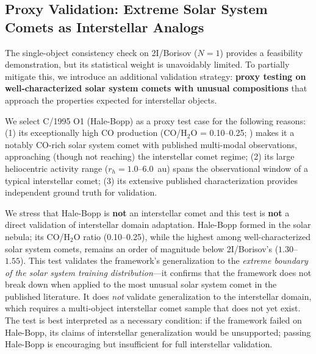 \documentclass[usenatbib]{mnras}
\begin{document}
\subsection{Proxy Validation: Extreme Solar System Comets as Interstellar Analogs}\label{sec:proxy}

The single-object consistency check on 2I/Borisov ($N=1$) provides a feasibility demonstration, but its statistical weight is unavoidably limited. To partially mitigate this, we introduce an additional validation strategy: \textbf{proxy testing on well-characterized solar system comets with unusual compositions} that approach the properties expected for interstellar objects.

We select C/1995 O1 (Hale-Bopp) as a proxy test case for the following reasons: (1) its exceptionally high CO production (CO/H$_2$O = 0.10--0.25; \citealt{bockelee04}) makes it a notably CO-rich solar system comet with published multi-modal observations, approaching (though not reaching) the interstellar comet regime; (2) its large heliocentric activity range ($r_h = 1.0$--6.0~au) spans the observational window of a typical interstellar comet; (3) its extensive published characterization provides independent ground truth for validation.

We stress that Hale-Bopp is \textbf{not} an interstellar comet and this test is \textbf{not} a direct validation of interstellar domain adaptation. Hale-Bopp formed in the solar nebula; its CO/H$_2$O ratio (0.10--0.25), while the highest among well-characterized solar system comets, remains an order of magnitude below 2I/Borisov's ($1.30$--$1.55$). This test validates the framework's generalization to the \textit{extreme boundary of the solar system training distribution}---it confirms that the framework does not break down when applied to the most unusual solar system comet in the published literature. It does \textit{not} validate generalization to the interstellar domain, which requires a multi-object interstellar comet sample that does not yet exist. The test is best interpreted as a necessary condition: if the framework failed on Hale-Bopp, its claims of interstellar generalization would be unsupported; passing Hale-Bopp is encouraging but insufficient for full interstellar validation.
\end{document}
